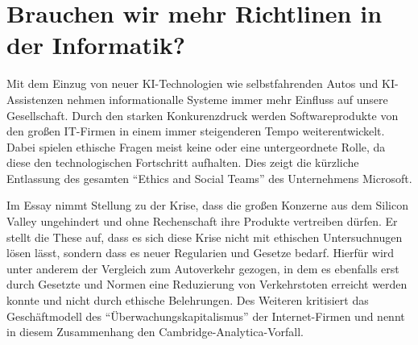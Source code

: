 

\section{Brauchen wir mehr Richtlinen in der Informatik?}
Mit dem Einzug von neuer KI-Technologien wie selbstfahrenden Autos und KI-Assistenzen nehmen informationalle Systeme immer mehr Einfluss
auf unsere Gesellschaft.
Durch den starken Konkurenzdruck werden Softwareprodukte von den großen IT-Firmen in einem immer steigenderen Tempo weiterentwickelt.
Dabei spielen ethische Fragen meist keine oder eine untergeordnete Rolle, da diese den technologischen Fortschritt aufhalten.
Dies zeigt die kürzliche Entlassung des gesamten \enquote{Ethics and Social Teams} des Unternehmens 
Microsoft\parencite{schifferMicrosoftJustLaid2023}.

Im Essay  nimmt  Stellung zu der Krise, dass die großen Konzerne aus
dem Silicon Valley ungehindert und ohne Rechenschaft ihre Produkte vertreiben dürfen\parencite{vardiAreWeHaving2018}.
Er stellt die These auf, dass es sich diese Krise nicht mit ethischen Untersuchnugen lösen lässt, sondern dass es neuer Regularien 
und Gesetze bedarf.
Hierfür wird unter anderem der Vergleich zum Autoverkehr gezogen, in dem es ebenfalls erst durch Gesetzte und Normen eine Reduzierung von
Verkehrstoten erreicht werden konnte und nicht durch ethische Belehrungen.
Des Weiteren kritisiert  das Geschäftmodell des \enquote{Überwachungskapitalismus} der Internet-Firmen
und nennt in diesem Zusammenhang den Cambridge-Analytica-Vorfall.


 

\newpage
